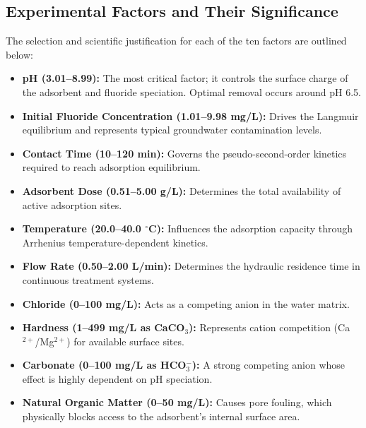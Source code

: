 \subsection{Experimental Factors and Their Significance}

The selection and scientific justification for each of the ten factors are outlined below:
\begin{itemize}
	\item \textbf{pH (3.01--8.99):} The most critical factor; it controls the surface charge of the adsorbent and fluoride speciation. Optimal removal occurs around pH 6.5.
	\item \textbf{Initial Fluoride Concentration (1.01--9.98 mg/L):} Drives the Langmuir equilibrium and represents typical groundwater contamination levels.
	\item \textbf{Contact Time (10--120 min):} Governs the pseudo-second-order kinetics required to reach adsorption equilibrium.
	\item \textbf{Adsorbent Dose (0.51--5.00 g/L):} Determines the total availability of active adsorption sites.
	\item \textbf{Temperature (20.0--40.0 $^\circ$C):} Influences the adsorption capacity through Arrhenius temperature-dependent kinetics.
	\item \textbf{Flow Rate (0.50--2.00 L/min):} Determines the hydraulic residence time in continuous treatment systems.
	\item \textbf{Chloride (0--100 mg/L):} Acts as a competing anion in the water matrix.
	\item \textbf{Hardness (1--499 mg/L as CaCO$_3$):} Represents cation competition (Ca$^{2+}$/Mg$^{2+}$) for available surface sites.
	\item \textbf{Carbonate (0--100 mg/L as HCO$_3^-$):} A strong competing anion whose effect is highly dependent on pH speciation.
	\item \textbf{Natural Organic Matter (0--50 mg/L):} Causes pore fouling, which physically blocks access to the adsorbent's internal surface area.
\end{itemize}

